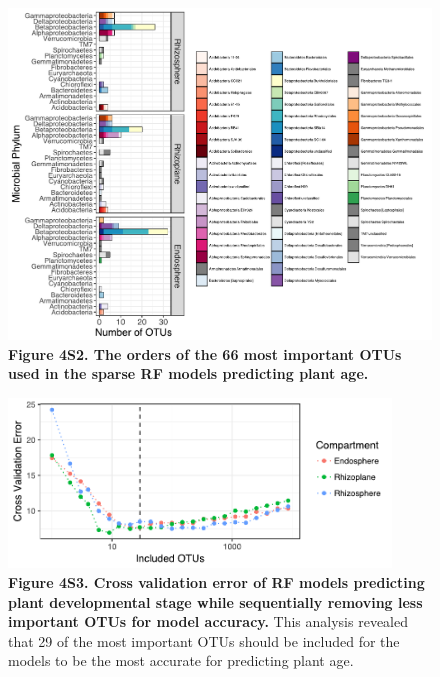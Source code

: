 \newpage

\begin{figure}[h]
\centering
\includegraphics[width=6in]{Figures/figure3_s2}
\captionsetup{labelformat=empty}
\caption[Figure 4S2]{\textbf{Figure 4S2. The orders of the 66 most important OTUs used in the sparse RF models predicting plant age.}}
\label{Figure 4S2}
\end{figure}

\newpage

\begin{figure}[h]
\centering
\includegraphics[width=4in]{Figures/figure3_s3}
\captionsetup{labelformat=empty}
\caption[Figure 4S3]{\textbf{Figure 4S3. Cross validation error of RF models predicting plant developmental stage while sequentially removing less important OTUs for model accuracy.} This analysis revealed that 29 of the most important OTUs should be included for the models to be the most accurate for predicting plant age.}
\label{Figure 4S3}
\end{figure}